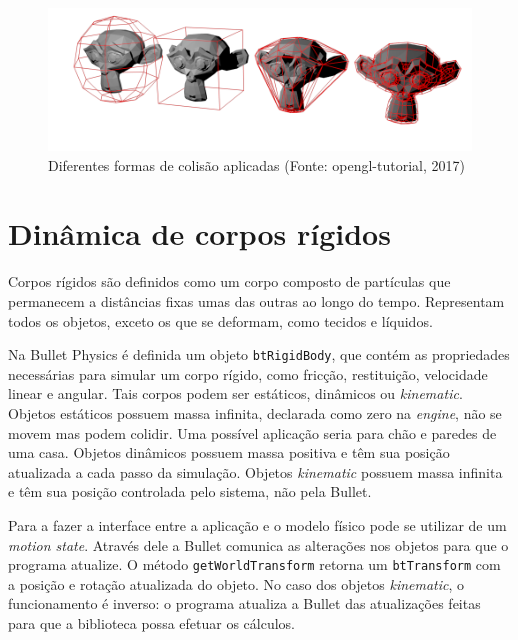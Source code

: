 \begin{figure}[H]
	\centering
	\includegraphics[scale=0.4]{imagens/collision-shapes.png}
	\caption{\small Diferentes formas de colisão aplicadas (Fonte: opengl-tutorial, 2017)}
	\label{fig:collisionshapes}
\end{figure}

\section{Dinâmica de corpos rígidos}
Corpos rígidos são definidos como um corpo composto de partículas que permanecem a distâncias fixas umas das outras ao longo do tempo. Representam todos os objetos, exceto os que se deformam, como tecidos e líquidos.

Na Bullet Physics é definida um objeto \lstinline{btRigidBody}, que contém as propriedades necessárias para simular um corpo rígido, como fricção, restituição, velocidade linear e angular. Tais corpos podem ser estáticos, dinâmicos ou \textit{kinematic}. Objetos estáticos possuem massa infinita, declarada como zero na \textit{engine}, não se movem mas podem colidir. Uma possível aplicação seria para chão e paredes de uma casa. Objetos dinâmicos possuem massa positiva e têm sua posição atualizada a cada passo da simulação. Objetos \textit{kinematic} possuem massa infinita e têm sua posição controlada pelo sistema, não pela Bullet.

Para a fazer a interface entre a aplicação e o modelo físico pode se utilizar de um \textit{motion state}. Através dele a Bullet comunica as alterações nos objetos para que o programa atualize. O método \lstinline{getWorldTransform} retorna um \lstinline{btTransform} com a posição e rotação atualizada do objeto. No caso dos objetos \textit{kinematic}, o funcionamento é inverso: o programa atualiza a Bullet das atualizações feitas para que a biblioteca possa efetuar os cálculos. 